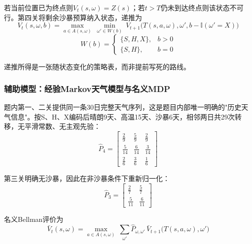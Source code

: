 \documentclass{cumcmthesis}
\numberwithin{equation}{section}
\numberwithin{figure}{section}
\numberwithin{table}{section}
\begin{document}
\begin{enumerate}
\hspace*{2em}若当前位置已为终点则$V_t(s,\omega)=Z(s)$；若$t>T$仍未到达终点则该状态不可行。第四关将剩余沙暴预算纳入状态，递推为
\vspace{-10pt}
\begin{equation}
V_t(s,\omega,b)=\max_{a\in A(s,\omega)}\ \min_{\omega'\in W(b)}\ V_{t+1}\bigl(T(s,a,\omega),\omega',b-\mathbb{I}(\omega'=X)\bigr)
\label{eq:q2_bellman4}
\end{equation}
\vspace{-10pt}
\begin{equation}
W(b)=
\begin{cases}
\{S,H,X\}, & b>0\\
\{S,H\}, & b=0
\end{cases}
\label{eq:q2_budget}
\end{equation}

\hspace*{2em}递推所得是一张随状态变化的策略表，而非提前写死的路线。
\end{enumerate}

\subsubsection{辅助模型：经验Markov天气模型与名义MDP}

题内第一、二关提供同一条30日完整天气序列，这是题目内部唯一明确的"历史天气信息"。按S、H、X编码后晴朗9天、高温15天、沙暴6天，相邻两日共29次转移，无平滑常数、无主观先验：
\vspace{-10pt}
\begin{equation}
\hat{P}_4=\begin{bmatrix}\tfrac{2}{9}&\tfrac{5}{9}&\tfrac{2}{9}\\\tfrac{5}{14}&\tfrac{6}{14}&\tfrac{3}{14}\\\tfrac{2}{6}&\tfrac{3}{6}&\tfrac{1}{6}\end{bmatrix}
\label{eq:q2_p4}
\end{equation}

第三关明确无沙暴，因此在非沙暴条件下重新归一化：
\vspace{-5pt}
\begin{equation}
\hat{P}_3=\begin{bmatrix}\tfrac{2}{7}&\tfrac{5}{7}\\\tfrac{5}{11}&\tfrac{6}{11}\end{bmatrix}
\label{eq:q2_p3}
\end{equation}

名义Bellman评价为
\vspace{-10pt}
\begin{equation}
\bar{V}_t(s,\omega)=\max_{a\in A(s,\omega)}\ \sum_{\omega'}\hat{P}_{\omega,\omega'}\,\bar{V}_{t+1}\bigl(T(s,a,\omega),\omega'\bigr)
\label{eq:q2_nominal}
\end{equation}
\end{document}
